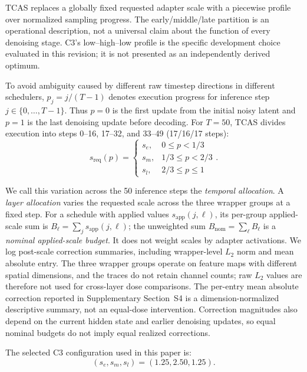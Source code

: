 \documentclass[times,twocolumn,final]{elsarticle}
\providecommand{\DIFadd}[1]{{\protect\color{blue} \sf #1}} %
\providecommand{\DIFaddbegin}{} %
\providecommand{\DIFaddend}{} %
\begin{document}
  \DIFaddbegin \DIFadd{TCAS }\DIFaddend replaces a globally fixed \DIFaddbegin \DIFadd{requested }\DIFaddend adapter scale with a   \DIFaddbegin \DIFadd{piecewise profile over normalized sampling progress. The early/middle/late partition is an operational description, not a universal claim about the function of every denoising stage. C3's low--high--low profile is the specific development choice evaluated in this revision; it is not presented as an independently derived optimum}\DIFaddend .

To avoid ambiguity caused by different raw timestep directions in different schedulers,   \DIFaddbegin \DIFadd{$p_j=j/(T-1)$ denotes execution progress for inference step $j\in\{0,\ldots,T-1\}$. Thus $p=0$ is the first update from }\DIFaddend the   \DIFaddbegin \DIFadd{initial noisy latent and $p=1$ is the last denoising update before decoding. For $T=50$, TCAS divides execution into steps 0--16, 17--32, and 33--49 (17/16/17 steps):
}\begin{equation}
s_{\mathrm{req}}(p) = \begin{cases} s_e, & 0 \leq p < 1/3 \\ s_m, & 1/3 \leq p < 2/3 \\ s_l, & 2/3 \leq p \leq 1 \end{cases}.
\label{eq:tcas}
\end{equation}\DIFaddend 

\DIFaddbegin \DIFadd{We call this variation across the 50 inference steps the \emph{temporal allocation}. A \emph{layer allocation} varies the requested scale across the three wrapper groups at a fixed step. For a schedule with applied values $s_{\mathrm{app}}(j,\ell)$, its per-group applied-scale sum is $B_\ell=\sum_j s_{\mathrm{app}}(j,\ell)$; the unweighted sum $B_{\mathrm{nom}}=\sum_\ell B_\ell$ is a \emph{nominal applied-scale budget}. It does not weight scales by adapter activations. We log post-scale correction summaries, including wrapper-level $L_2$ norm and mean absolute entry. The three wrapper groups operate on feature maps with different spatial dimensions, and the traces do not retain channel counts; raw $L_2$ values are therefore not used for cross-layer dose comparisons. The per-entry mean absolute correction reported in Supplementary Section~S4 is a dimension-normalized descriptive summary, not an equal-dose intervention. Correction magnitudes also depend on the current hidden state and earlier denoising updates, so equal nominal budgets do not imply equal realized corrections.
}

\DIFaddend The selected C3 configuration used in this paper is:
\begin{equation}
(s_e, s_m, s_l) = (1.25, 2.50, 1.25).
\end{equation}
\end{document}
